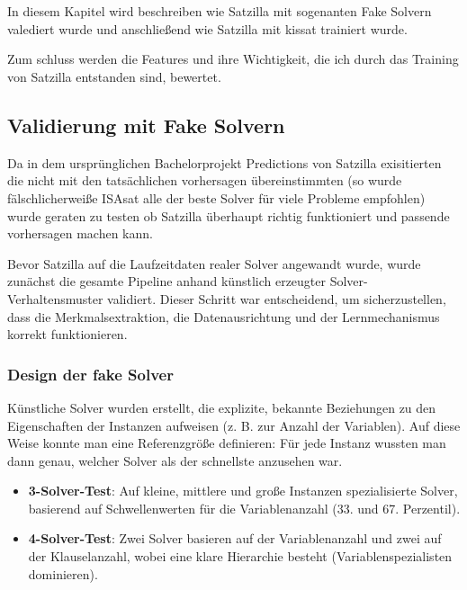 \section{}\label{sec:satzilla_outcome}

In diesem Kapitel wird beschreiben wie Satzilla mit sogenanten Fake Solvern valediert wurde und 
anschließend wie Satzilla mit kissat trainiert wurde.

Zum schluss werden die Features und ihre Wichtigkeit, die ich durch das Training von Satzilla 
entstanden sind, bewertet.

\subsection{Validierung mit Fake Solvern}

Da in dem ursprünglichen Bachelorprojekt Predictions von Satzilla exisitierten die nicht mit den 
tatsächlichen vorhersagen übereinstimmten (so wurde fälschlicherweiße ISAsat alle der beste Solver 
für viele Probleme empfohlen) wurde geraten zu testen ob Satzilla überhaupt
richtig funktioniert und passende vorhersagen machen kann.

Bevor Satzilla auf die Laufzeitdaten realer Solver angewandt wurde, wurde zunächst die gesamte 
Pipeline anhand künstlich erzeugter Solver-Verhaltensmuster validiert. Dieser Schritt war 
entscheidend, um sicherzustellen, dass die Merkmalsextraktion, die Datenausrichtung und der 
Lernmechanismus korrekt funktionieren.




\subsubsection{Design der fake Solver}

Künstliche Solver wurden erstellt, die explizite, bekannte Beziehungen zu den Eigenschaften der 
Instanzen aufweisen (z. B. zur Anzahl der Variablen). Auf diese Weise konnte man eine Referenzgröße 
definieren: Für jede Instanz wussten man dann genau, welcher Solver als der schnellste anzusehen war.

\begin{itemize}
    \setlength{\itemsep}{0pt}
    \setlength{\parskip}{0pt}
    \setlength{\parsep}{0pt}
    \item \textbf{3-Solver-Test}: Auf kleine, mittlere und große Instanzen spezialisierte Solver, basierend auf Schwellenwerten für die Variablenanzahl (33. und 67. Perzentil).
    \item \textbf{4-Solver-Test}: Zwei Solver basieren auf der Variablenanzahl und zwei auf der Klauselanzahl, wobei eine klare Hierarchie besteht (Variablenspezialisten dominieren).
\end{itemize}

